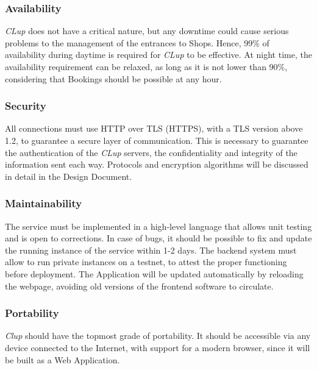 \subsubsection{Availability}
\emph{CLup} does not have a critical nature, but any downtime could cause serious problems to the management of the entrances to Shops. Hence, 99\% of availability during daytime is required for \emph{CLup} to be effective. At night time, the availability requirement can be relaxed, as long as it is not lower than 90\%, considering that Bookings should be possible at any hour.
\subsubsection{Security}
All connections must use HTTP over TLS (HTTPS), with a TLS version above 1.2, to guarantee a secure layer of communication.
This is necessary to guarantee the authentication of the \emph{CLup} servers, the confidentiality and integrity of the information sent each way.
Protocols and encryption algorithms will be discussed in detail in the Design Document.
\subsubsection{Maintainability}
The service must be implemented in a high-level language that allows unit testing and is open to corrections. In case of bugs, it should be possible to fix and update the running instance of the service within 1-2 days.
The backend system must allow to run private instances on a testnet, to attest the proper functioning before deployment.
The Application will be updated automatically by reloading the webpage, avoiding old versions of the frontend software to circulate.
\subsubsection{Portability}
\textit{Clup} should have the topmost grade of portability. It should be accessible via any device connected to the Internet, with support for a modern browser, since it will be built as a Web Application.
